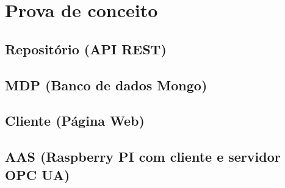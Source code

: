 \chapter{Prova de conceito}

\section{Repositório (API REST)}

\section{MDP (Banco de dados Mongo)}

\section{Cliente (Página Web)}

\section{AAS (Raspberry PI com cliente e servidor OPC UA)}